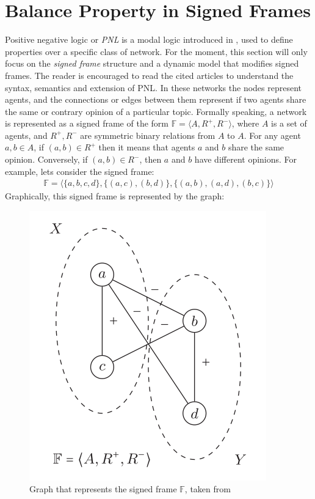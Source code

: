 \section{Balance Property in Signed Frames}
Positive negative logic or \textit{PNL} is a modal logic introduced in \cite{PNL1, PNL2}, used to define properties over a specific class of network. For the moment, this section will only focus on the \textit{signed frame} structure and a dynamic model that modifies signed frames. The reader is encouraged to read the cited articles to understand the syntax, semantics and extension of PNL. In these networks the nodes represent agents, and the connections or edges between them represent if two agents share the same or contrary opinion of a particular topic. Formally speaking, a network is represented as a signed frame of the form $\mathbb{F} = \langle A, R^+, R^- \rangle$, where $A$ is a set of agents, and $R^+,R^-$ are symmetric binary relations from $A$ to $A$. For any agent $a,b \in A$, if $(a,b) \in R^+$ then it means that agents $a$ and $b$ share the same opinion. Conversely, if $(a,b) \in R^-$, then $a$ and $b$ have different opinions. For example, lets consider the signed frame:
\begin{align*}
    \mathbb{F} = \langle \{a,b,c,d\}, \{(a,c),(b,d)\},\{(a,b),(a,d), (b,c)\} \rangle
\end{align*}
Graphically, this signed frame is represented by the graph:
\begin{figure}[H]
    \centering
    \includegraphics[scale = 0.5]{images/CS10.png}
    \caption{Graph that represents the signed frame $\mathbb{F}$, taken from \cite{PNL1}}
    \label{fig:CS10}
\end{figure}
